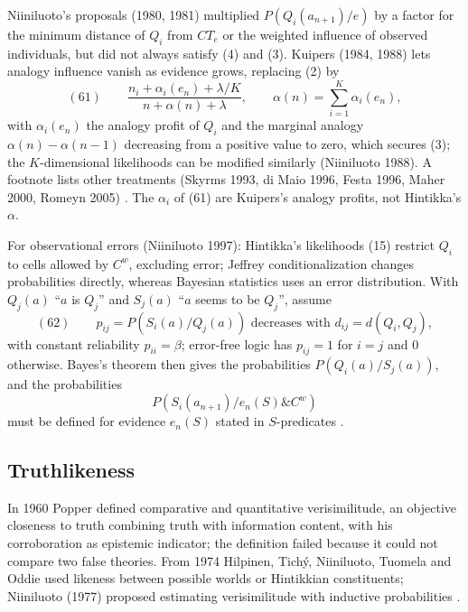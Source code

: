 Niiniluoto's proposals (1980, 1981) multiplied \(P(Q_i(a_{n+1})/e)\) by a
factor for the minimum distance of \(Q_i\) from \(CT_e\) or the weighted
influence of observed individuals, but did not always satisfy (4) and (3).
Kuipers (1984, 1988) lets analogy influence vanish as evidence grows,
replacing (2) by
\[
 (61)\qquad \frac{n_i+\alpha_i(e_n)+\lambda/K}{n+\alpha(n)+\lambda},
 \qquad \alpha(n)=\sum_{i=1}^K\alpha_i(e_n),
\]
with \(\alpha_i(e_n)\) the analogy profit of \(Q_i\) and the marginal analogy
\(\alpha(n)-\alpha(n-1)\) decreasing from a positive value to zero, which
secures (3); the \(K\)-dimensional likelihoods can be modified similarly
(Niiniluoto 1988). A footnote lists other treatments (Skyrms 1993, di Maio
1996, Festa 1996, Maher 2000, Romeyn 2005)
\cite[p.~342 and n.~10]{Niiniluoto2011HintikkaProgramReading}. The
\(\alpha_i\) of (61) are Kuipers's analogy profits, not Hintikka's
\(\alpha\).

For observational errors (Niiniluoto 1997): Hintikka's likelihoods (15)
restrict \(Q_i\) to cells allowed by \(C^w\), excluding error; Jeffrey
conditionalization changes probabilities directly, whereas Bayesian
statistics uses an error distribution. With \(Q_j(a)\) ``\(a\) is \(Q_j\)'' and
\(S_j(a)\) ``\(a\) seems to be \(Q_j\)'', assume
\[
 (62)\qquad p_{ij}=P(S_i(a)/Q_j(a))\text{ decreases with }d_{ij}=d(Q_i,Q_j),
\]
with constant reliability \(p_{ii}=\beta\); error-free logic has \(p_{ij}=1\)
for \(i=j\) and \(0\) otherwise. Bayes's theorem then gives the
probabilities \(P(Q_i(a)/S_j(a))\), and the probabilities
\[
 P(S_i(a_{n+1})/e_n(S)\&C^w)
\]
must be defined for evidence \(e_n(S)\) stated in \(S\)-predicates
\cite[pp.~342--343]{Niiniluoto2011HintikkaProgramReading}.

\subsection{Truthlikeness}
\label{sec:p15-w02b-p15-030-nn-truthlikeness}

In 1960 Popper defined comparative and quantitative verisimilitude, an
objective closeness to truth combining truth with information content,
with his corroboration as epistemic indicator; the definition failed
because it could not compare two false theories. From 1974 Hilpinen,
Tichý, Niiniluoto, Tuomela and Oddie used likeness between possible worlds
or Hintikkian constituents; Niiniluoto (1977) proposed estimating
verisimilitude with inductive probabilities
\cite[p.~343]{Niiniluoto2011HintikkaProgramReading}.

